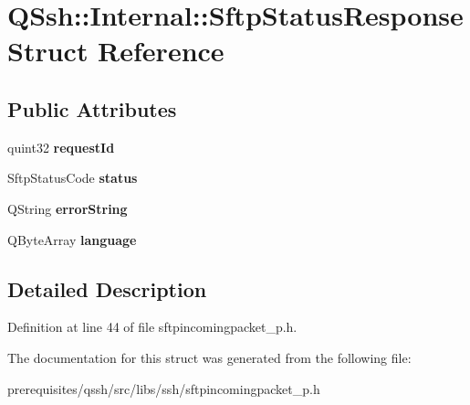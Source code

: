 \hypertarget{struct_q_ssh_1_1_internal_1_1_sftp_status_response}{}\section{Q\+Ssh\+:\+:Internal\+:\+:Sftp\+Status\+Response Struct Reference}
\label{struct_q_ssh_1_1_internal_1_1_sftp_status_response}
\subsection*{Public Attributes}
\begin{DoxyCompactItemize}
\item 
\mbox{\label{struct_q_ssh_1_1_internal_1_1_sftp_status_response_a14005f4935f005e51aca5e051bdbb752}} 
quint32 {\bfseries request\+Id}
\item 
\mbox{\label{struct_q_ssh_1_1_internal_1_1_sftp_status_response_a796d8daf83f794184f298a95ec39727c}} 
Sftp\+Status\+Code {\bfseries status}
\item 
\mbox{\label{struct_q_ssh_1_1_internal_1_1_sftp_status_response_ad7a71f8a220487ee38336cb79583d281}} 
Q\+String {\bfseries error\+String}
\item 
\mbox{\label{struct_q_ssh_1_1_internal_1_1_sftp_status_response_a167c60424ec21012a3c9ce8bc640b808}} 
Q\+Byte\+Array {\bfseries language}
\end{DoxyCompactItemize}


\subsection{Detailed Description}


Definition at line 44 of file sftpincomingpacket\+\_\+p.\+h.



The documentation for this struct was generated from the following file\+:\begin{DoxyCompactItemize}
\item 
prerequisites/qssh/src/libs/ssh/sftpincomingpacket\+\_\+p.\+h\end{DoxyCompactItemize}
